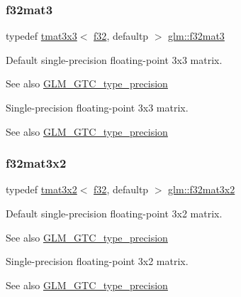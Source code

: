 \subsubsection{\texorpdfstring{f32mat3}{f32mat3}}
{\footnotesize\ttfamily typedef \hyperlink{structglm_1_1tmat3x3}{tmat3x3}$<$ \hyperlink{group__gtc__type__precision_ga0ec999b57f5330d9021256e96038df04}{f32}, defaultp $>$ \hyperlink{group__gtc__type__precision_ga5fbaec59b220964f59403bb362b5f93e}{glm\+::f32mat3}}

Default single-\/precision floating-\/point 3x3 matrix. \begin{DoxySeeAlso}{See also}
\hyperlink{group__gtc__type__precision}{G\+L\+M\+\_\+\+G\+T\+C\+\_\+type\+\_\+precision}
\end{DoxySeeAlso}
Single-\/precision floating-\/point 3x3 matrix. \begin{DoxySeeAlso}{See also}
\hyperlink{group__gtc__type__precision}{G\+L\+M\+\_\+\+G\+T\+C\+\_\+type\+\_\+precision} 
\end{DoxySeeAlso}
\mbox{\label{group__gtc__type__precision_ga61653615c76194cdf3454e6e703525e0}} 
\subsubsection{\texorpdfstring{f32mat3x2}{f32mat3x2}}
{\footnotesize\ttfamily typedef \hyperlink{structglm_1_1tmat3x2}{tmat3x2}$<$ \hyperlink{group__gtc__type__precision_ga0ec999b57f5330d9021256e96038df04}{f32}, defaultp $>$ \hyperlink{group__gtc__type__precision_ga61653615c76194cdf3454e6e703525e0}{glm\+::f32mat3x2}}

Default single-\/precision floating-\/point 3x2 matrix. \begin{DoxySeeAlso}{See also}
\hyperlink{group__gtc__type__precision}{G\+L\+M\+\_\+\+G\+T\+C\+\_\+type\+\_\+precision}
\end{DoxySeeAlso}
Single-\/precision floating-\/point 3x2 matrix. \begin{DoxySeeAlso}{See also}
\hyperlink{group__gtc__type__precision}{G\+L\+M\+\_\+\+G\+T\+C\+\_\+type\+\_\+precision} 
\end{DoxySeeAlso}
\mbox{\label{group__gtc__type__precision_ga715b36ea1e2d1ffaaef7517cc78b3877}} 
